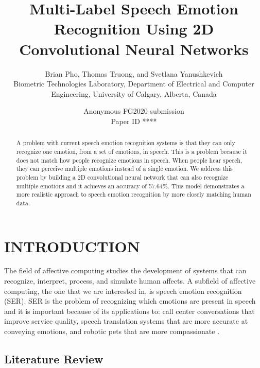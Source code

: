 \documentclass[a4paper, 10pt, conference]{ieeeconf}      %
\title{\LARGE \bf
Multi-Label Speech Emotion Recognition Using 2D Convolutional Neural Networks
}
\author{\parbox{16cm}{\centering
    {\large Brian Pho, Thomas Truong, and Svetlana Yanushkevich}\\
    {\normalsize
    Biometric Technologies Laboratory, Department of Electrical and Computer Engineering, University of Calgary, Alberta, Canada\\}}
}
\def\FGPaperID{****} %
\begin{document}
\ifFGfinal
\thispagestyle{empty}
\pagestyle{empty}
\else
\author{Anonymous FG2020 submission\\ Paper ID \FGPaperID \\}
\pagestyle{plain}
\fi
\maketitle


\begin{abstract}

A problem with current speech emotion recognition systems is that they can only recognize one emotion, from a set of emotions, in speech. This is a problem because it does not match how people recognize emotions in speech. When people hear speech, they can perceive multiple emotions instead of a single emotion. We address this problem by building a 2D convolutional neural network that can also recognize multiple emotions and it achieves an accuracy of 57.64\%. This model demonstrates a more realistic approach to speech emotion recognition by more closely matching human data.

\end{abstract}


\section{INTRODUCTION}

The field of affective computing studies the development of systems that can recognize, interpret, process, and simulate human affects. A subfield of affective computing, the one that we are interested in, is speech emotion recognition (SER). SER is the problem of recognizing which emotions are present in speech and it is important because of its applications to: call center conversations that improve service quality, speech translation systems that are more accurate at conveying emotions, and robotic pets that are more compassionate \cite{Koolagudi2012}.

\subsection{Literature Review}
\end{document}
